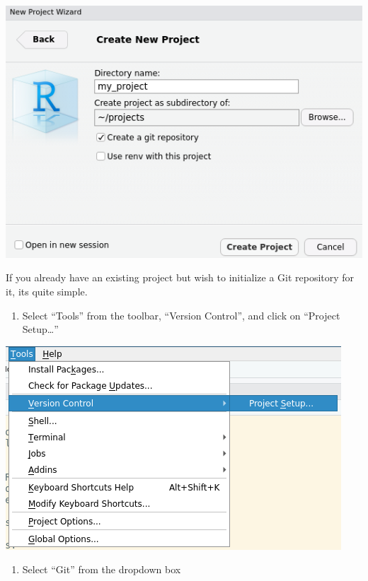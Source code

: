 \documentclass[
]{book}
\providecommand{\tightlist}{%
  \setlength{\itemsep}{0pt}\setlength{\parskip}{0pt}}
\begin{document}
\includegraphics{images/02-newgit_1.png}

If you already have an existing project but wish to initialize a Git repository for it, its quite simple.

\begin{enumerate}
\def\labelenumi{\arabic{enumi}.}
\tightlist
\item
  Select ``Tools'' from the toolbar, ``Version Control'', and click on ``Project Setup\ldots{}''
\end{enumerate}

\includegraphics{images/02-newgit_2.png}

\begin{enumerate}
\def\labelenumi{\arabic{enumi}.}
\setcounter{enumi}{1}
\tightlist
\item
  Select ``Git'' from the dropdown box
\end{enumerate}
\end{document}

